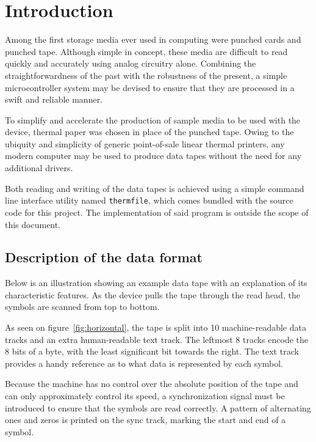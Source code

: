 \documentclass{article}
\begin{document}
	\restoregeometry
	
	\newpage
	\renewcommand{\baselinestretch}{0}\normalsize
	\tableofcontents
	\renewcommand{\baselinestretch}{1}\normalsize
	
	\newpage
	\section{Introduction}
	
	Among the first storage media ever used in computing were punched cards and
	punched tape. Although simple in concept, these media are difficult to read
	quickly and accurately using analog circuitry alone. Combining the
	straightforwardness of the past with the robustness of the present, a
	simple microcontroller system may be devised to ensure that they are
	processed in a swift and reliable manner.
	
	To simplify and accelerate the production of sample media to be used with
	the device, thermal paper was chosen in place of the punched tape. Owing to
	the ubiquity and simplicity of generic point-of-sale linear thermal
	printers, any modern computer may be used to produce data tapes without the
	need for any additional drivers.
	
	Both reading and writing of the data tapes is achieved using a simple
	command line interface utility named \texttt{thermfile}, which comes
	bundled with the source code for this project. The implementation of said
	program is outside the scope of this document.
	
	\subsection{Description of the data format}
	\label{sec:format}
	
	Below is an illustration showing an example data tape with an explanation
	of its characteristic features. As the device pulls the tape through the
	read head, the symbols are scanned from top to bottom.
	
	As seen on figure~\ref{fig:horizontal}, the tape is split into 10
	machine-readable data tracks and an extra human-readable text track. The
	leftmost 8 tracks encode the 8 bits of a byte, with the least significant
	bit towards the right. The text track provides a handy reference as to what
	data is represented by each symbol.
	
	Because the machine has no control over the absolute position of the tape
	and can only approximately control its speed, a synchronization signal must
	be introduced to ensure that the symbols are read correctly. A pattern of
	alternating ones and zeros is printed on the sync track, marking the start
	and end of a symbol.
	
\end{document}
